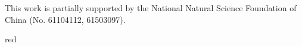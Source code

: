 \begin{acknowledgements}
This work is partially supported by the National Natural Science Foundation of China (No. 61104112, 61503097).
\end{acknowledgements}
\begin{color}{red}
%

%
%

\end{color}
%
%




